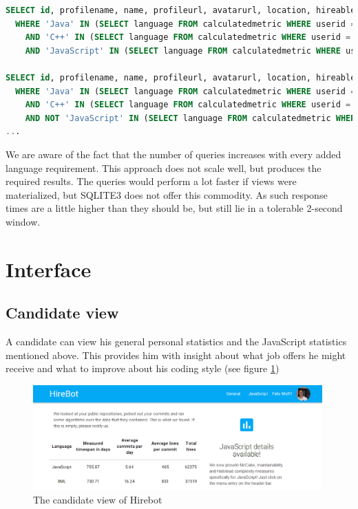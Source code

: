 \begin{minipage}{\linewidth}
\begin{lstlisting}[language=SQL, frame=false]
SELECT id, profilename, name, profileurl, avatarurl, location, hireable, followers, following FROM users u
  WHERE 'Java' IN (SELECT language FROM calculatedmetric WHERE userid = u.id AND timespan >= 360*1.5)
    AND 'C++' IN (SELECT language FROM calculatedmetric WHERE userid = u.id AND timespan >= 360*1.5)
    AND 'JavaScript' IN (SELECT language FROM calculatedmetric WHERE userid = u.id AND timespan >= 360*1.5)

SELECT id, profilename, name, profileurl, avatarurl, location, hireable, followers, following FROM users u
  WHERE 'Java' IN (SELECT language FROM calculatedmetric WHERE userid = u.id AND timespan >= 360*1.5)
    AND 'C++' IN (SELECT language FROM calculatedmetric WHERE userid = u.id AND timespan >= 360*1.5)
    AND NOT 'JavaScript' IN (SELECT language FROM calculatedmetric WHERE userid = u.id AND timespan >= 360*1.5)
...
\end{lstlisting}
\end{minipage}

We are aware of the fact that the number of queries increases with every added language requirement. This approach does not scale well, but produces the required results. The queries would perform a lot faster if views were materialized, but SQLITE3 does not offer this commodity. As such response times are a little higher than they should be, but still lie in a tolerable 2-second window.

\section{Interface}
\subsection{Candidate view}
A candidate can view his general personal statistics and the JavaScript statistics
mentioned above. This provides him with insight about what job offers he might
receive and what to improve about his coding style (see figure \ref{fig:candidateview})

\begin{figure}
  \includegraphics[width=30em]{gfx/candidateview.png}
  \caption{The candidate view of Hirebot}
  \label{fig:candidateview}
\end{figure}

